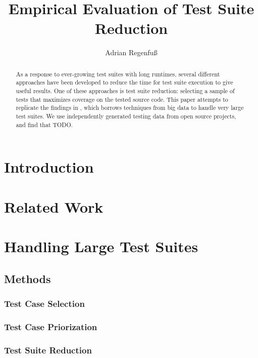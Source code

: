 \documentclass[a4paper,10pt]{article}
\title{Empirical Evaluation of Test Suite Reduction}
\author{Adrian Regenfuß}
\begin{document}
\maketitle


\begin{abstract}
As a response to ever-growing test suites with long runtimes, several
different approaches have been developed to reduce the time for test
suite execution to give useful results. One of these approaches is test
suite reduction: selecting a sample of tests that maximizes coverage on
the tested source code. This paper attempts to replicate the findings
in \citealt{cruciani2019scalable}, which borrows techniques from big
data to handle very large test suites. We use independently generated
testing data from open source projects, and find that TODO.
\end{abstract}

\section{Introduction}

\section{Related Work}

\section{Handling Large Test Suites}

\subsection{Methods}

\subsubsection{Test Case Selection}

\subsubsection{Test Case Priorization}

\subsubsection{Test Suite Reduction}
\end{document}
